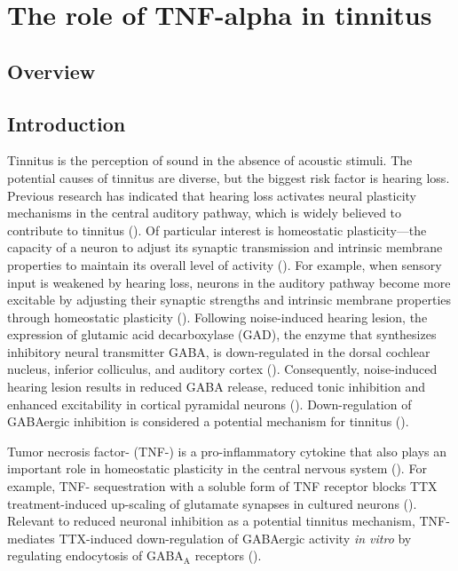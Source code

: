 \chapter{The role of TNF-alpha in tinnitus}

\section{Overview}

\newrefsection

\section{Introduction}
Tinnitus is the perception of sound in the absence of acoustic stimuli. The potential causes of tinnitus are diverse, but the biggest risk factor is hearing loss. Previous research has indicated that hearing loss activates neural plasticity mechanisms in the central auditory pathway, which is widely believed to contribute to tinnitus (\cite{Roberts2010}). Of particular interest is homeostatic plasticity---the capacity of a neuron to adjust its synaptic transmission and intrinsic membrane properties to maintain its overall level of activity (\cite{Turrigiano1999, Davis2001}). For example, when sensory input is weakened by hearing loss, neurons in the auditory pathway become more excitable by adjusting their synaptic strengths and intrinsic membrane properties through homeostatic plasticity (\cite{Kotak2005, Yang2011a, Yang2012}). Following noise-induced hearing lesion, the expression of glutamic acid decarboxylase (GAD), the enzyme that synthesizes inhibitory neural transmitter GABA, is down-regulated in the dorsal cochlear nucleus, inferior colliculus, and auditory cortex (\cite{Abbott1999, Milbrandt2000, Yang2011a, Browne2012}). Consequently, noise-induced hearing lesion results in reduced GABA release, reduced tonic inhibition and enhanced excitability in cortical pyramidal neurons (\cite{Yang2011a, Yang2012}). Down-regulation of GABAergic inhibition is considered a potential mechanism for tinnitus (\cite{Yang2011a, Llano2012}).

Tumor necrosis factor-\textalpha{} (TNF-\textalpha{}) is a pro-inflammatory cytokine that also plays an important role in homeostatic plasticity in the central nervous system (\cite{Stellwagen2005, Stellwagen2006, Steinmetz2010, Wang2011}). For example, TNF-\textalpha{} sequestration with a soluble form of TNF receptor blocks TTX treatment-induced up-scaling of glutamate synapses in cultured neurons (\cite{Stellwagen2006, Steinmetz2010}). Relevant to reduced neuronal inhibition as a potential tinnitus mechanism, TNF-\textalpha{} mediates TTX-induced down-regulation of GABAergic activity \textit{in vitro} by regulating endocytosis of GABA$_\mathrm{A}$ receptors (\cite{Stellwagen2005, Stellwagen2006}).

